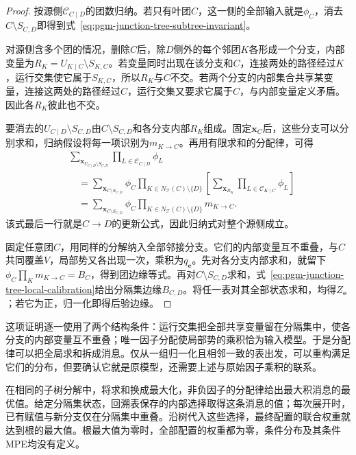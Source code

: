 \begin{proof}
  按源侧$\mathcal C_{C\mid D}$的团数归纳。若只有叶团$C$，这一侧的全部输入就是$\phi_C$，消去$C\setminus S_{C,D}$即得到式~\eqref{eq:pgm-junction-tree-subtree-invariant}。

  对源侧含多个团的情况，删除$C$后，除$D$侧外的每个邻团$K$各形成一个分支，内部变量为$R_K=U_{K\mid C}\setminus S_{K,C}$。若变量同时出现在该分支和$C$，连接两处的路径经过$K$，运行交集使它属于$S_{K,C}$，所以$R_K$与$C$不交。若两个分支的内部集合共享某变量，连接这两处的路径经过$C$，运行交集又要求它属于$C$，与内部变量定义矛盾。因此各$R_K$彼此也不交。

  要消去的$U_{C\mid D}\setminus S_{C,D}$由$C\setminus S_{C,D}$和各分支内部$R_K$组成。固定$\bm{x}_C$后，这些分支可以分别求和，归纳假设将每一项识别为$m_{K\to C}$。再用有限求和的分配律，可得
  \[
    \begin{aligned}
      &\sum_{\bm{x}_{U_{C\mid D}\setminus S_{C,D}}}
         \prod_{L\in\mathcal{C}_{C\mid D}}\phi_L\\
      &\quad=\sum_{\bm{x}_{C\setminus S_{C,D}}}\phi_C
         \prod_{K\in N_{\mathcal{T}}(C)\setminus\{D\}}
          \left[
            \sum_{\bm{x}_{R_K}}
              \prod_{L\in\mathcal{C}_{K\mid C}}\phi_L
          \right]\\
      &\quad=\sum_{\bm{x}_{C\setminus S_{C,D}}}\phi_C
         \prod_{K\in N_{\mathcal{T}}(C)\setminus\{D\}}m_{K\to C}.
    \end{aligned}
  \]
  该式最后一行就是$C\to D$的更新公式，因此归纳式对整个源侧成立。

  固定任意团$C$，用同样的分解纳入全部邻接分支。它们的内部变量互不重叠，与$C$共同覆盖$V$，局部势又各出现一次，乘积为$q_{\bm e}$。先对各分支内部求和，就留下$\phi_C\prod_Km_{K\to C}=B_C$，得到团边缘等式。再对$C\setminus S_{C,D}$求和，式~\eqref{eq:pgm-junction-tree-local-calibration}给出分隔集边缘$B_{C,D}$。将任一表对其全部状态求和，均得$Z_{\bm e}$；若它为正，归一化即得后验边缘。
\end{proof}

这项证明逐一使用了两个结构条件：运行交集把全部共享变量留在分隔集中，使各分支的内部变量互不重叠；唯一因子分配使局部势的乘积恰为输入模型。于是分配律可以把全局求和拆成消息。仅从一组归一化且相邻一致的表出发，可以重构满足它们的分布，但要确认它就是原模型，还需要上述与原始因子乘积的联系。

在相同的子树分解中，将求和换成最大化，非负因子的分配律给出最大积消息的最优值。给定分隔集状态，回溯表保存的内部选择取得这条消息的值；每次展开时，已有赋值与新分支仅在分隔集中重叠。沿树代入这些选择，最终配置的联合权重就达到根的最大值。根最大值为零时，全部配置的权重都为零，条件分布及其条件MPE均没有定义。

